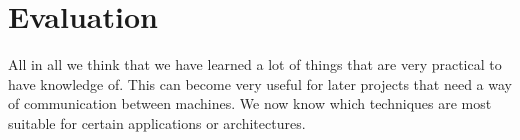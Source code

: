 \documentclass{article}
\begin{document}
\section{Evaluation}
	All in all we think that we have learned a lot of things that are very 
	practical to have knowledge of. This can become very useful for later 
	projects that need a way of communication between machines. We now know 
	which techniques are most suitable for certain applications or architectures.
\end{document}
